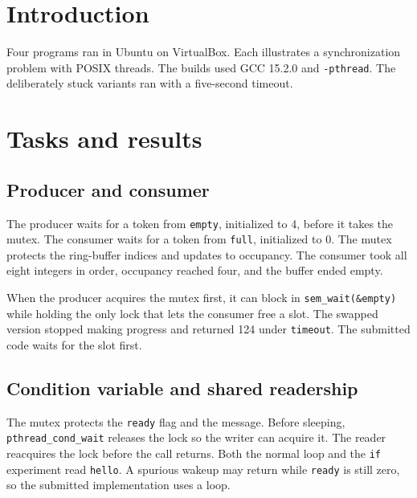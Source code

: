\chapter{Introduction}

Four programs ran in Ubuntu on VirtualBox. Each illustrates a synchronization problem with POSIX threads. The builds used GCC 15.2.0 and \texttt{-pthread}. The deliberately stuck variants ran with a five-second timeout.

\chapter{Tasks and results}

\section{Producer and consumer}

The producer waits for a token from \texttt{empty}, initialized to 4, before it takes the mutex. The consumer waits for a token from \texttt{full}, initialized to 0. The mutex protects the ring-buffer indices and updates to occupancy. The consumer took all eight integers in order, occupancy reached four, and the buffer ended empty.


When the producer acquires the mutex first, it can block in \texttt{sem\_wait(\&empty)} while holding the only lock that lets the consumer free a slot. The swapped version stopped making progress and returned 124 under \texttt{timeout}. The submitted code waits for the slot first.

\clearpage
\section{Condition variable and shared readership}

The mutex protects the \texttt{ready} flag and the message. Before sleeping, \texttt{pthread\_cond\_wait} releases the lock so the writer can acquire it. The reader reacquires the lock before the call returns. Both the normal loop and the \texttt{if} experiment read \texttt{hello}. A spurious wakeup may return while \texttt{ready} is still zero, so the submitted implementation uses a loop.


